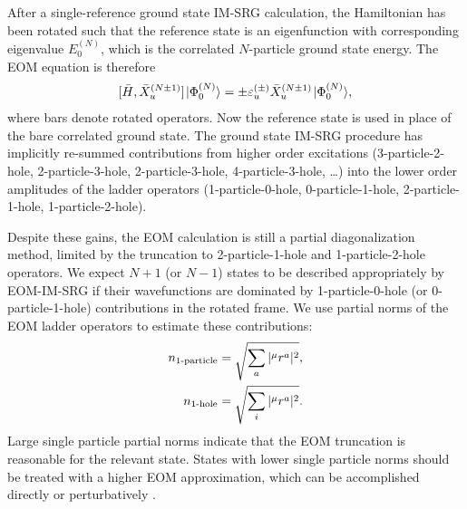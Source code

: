 \documentclass[thesis.tex]{subfiles}
\begin{document}
After a single-reference ground state IM-SRG calculation, the Hamiltonian has been rotated such that the reference state is an eigenfunction with corresponding eigenvalue $E^{(N)}_0$, which is the correlated $N$-particle ground state energy. The EOM equation is therefore
\begin{align} \label{eq:EOMIMSRG}
  [\bar{H},\bar{X}^{(N \pm 1)}_u] \hspace{1pt}\lvert \Phi^{(N)}_0 \rangle = \pm \varepsilon^{(\pm)}_u \bar{X}^{(N \pm 1)}_u \hspace{1pt}\lvert \Phi^{(N)}_0 \rangle,
\end{align}
where bars denote rotated operators. Now the reference state is used in place of the bare correlated ground state. The ground state IM-SRG procedure has implicitly re-summed contributions from higher order excitations (3-particle-2-hole, 2-particle-3-hole, 2-particle-3-hole, 4-particle-3-hole, \ldots) into the lower order amplitudes of the ladder operators (1-particle-0-hole, 0-particle-1-hole, 2-particle-1-hole, 1-particle-2-hole).

Despite these gains, the EOM calculation is still a partial diagonalization method, limited by the truncation to 2-particle-1-hole and 1-particle-2-hole operators. We expect $N + 1$ (or $N - 1$) states to be described appropriately by EOM-IM-SRG if their wavefunctions are dominated by 1-particle-0-hole (or 0-particle-1-hole) contributions in the rotated frame. We use partial norms of the EOM ladder operators to estimate these contributions:
\begin{align}
  \label{eq:partial_norms_p}
  n_{\text{1-particle}} &= \sqrt{\sum_a | {}^{\mu}r^{a}_{} |^2},\\
  \label{eq:partial_norms_h}
  n_{\text{1-hole}} &= \sqrt{\sum_i | {}^{\mu}r^{a}_{} |^2}.
\end{align}
Large single particle partial norms indicate that the EOM truncation is reasonable for the relevant state. States with lower single particle norms should be treated with a higher EOM approximation, which can be accomplished directly or perturbatively \cite{PARZUCHOWSKI2017044304}.
\end{document}
